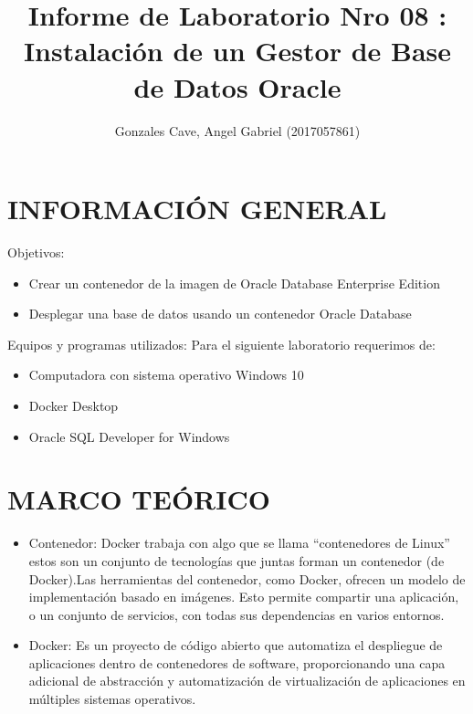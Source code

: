 \documentclass[preprint,12pt]{elsarticle}
\begin{document}
	\begin{frontmatter}
		\title{\huge Informe de Laboratorio Nro 08 : Instalación de un Gestor de Base de Datos Oracle}
		\address{Universidad Privada de Tacna}
		\address{Escuela Profesional de Ingeniería de Sistemas}
		\address{Curso : Base de Datos II}		
		\author{Gonzales Cave, Angel Gabriel              	(2017057861)}		
		\address{Tacna, Perú}
\end{frontmatter}

\section{INFORMACIÓN GENERAL}
Objetivos:
\begin{itemize}
\item Crear un contenedor de la imagen de Oracle Database Enterprise Edition 
\item Desplegar una base de datos usando un contenedor Oracle Database
\end{itemize}
Equipos y programas utilizados:
Para el siguiente laboratorio requerimos de:
\begin{itemize}
\item Computadora con sistema operativo Windows 10
\item Docker Desktop
\item Oracle SQL Developer for Windows

\end{itemize}

\section{MARCO TEÓRICO}
\begin{itemize}
\item Contenedor: Docker trabaja con algo que se llama “contenedores de Linux” estos son un conjunto de tecnologías que juntas forman un contenedor (de Docker).Las herramientas del contenedor, como Docker, ofrecen un modelo de implementación basado en imágenes. Esto permite compartir una aplicación, o un conjunto de servicios, con todas sus dependencias en varios entornos.
\item Docker: Es un proyecto de código abierto que automatiza el despliegue de aplicaciones dentro de contenedores de software, proporcionando una capa adicional de abstracción y automatización de virtualización de aplicaciones en múltiples sistemas operativos.
\end{itemize}
\end{document}
